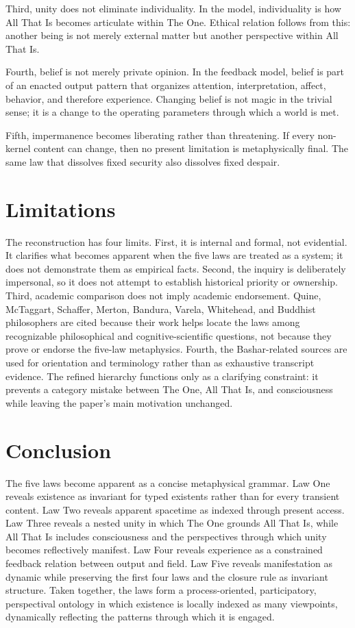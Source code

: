 \documentclass[11pt]{article}
\begin{document}
Third, unity does not eliminate individuality.  In the model, individuality is how All That Is becomes articulate within The One.  Ethical relation follows from this: another being is not merely external matter but another perspective within All That Is.

Fourth, belief is not merely private opinion.  In the feedback model, belief is part of an enacted output pattern that organizes attention, interpretation, affect, behavior, and therefore experience.  Changing belief is not magic in the trivial sense; it is a change to the operating parameters through which a world is met.

Fifth, impermanence becomes liberating rather than threatening.  If every non-kernel content can change, then no present limitation is metaphysically final.  The same law that dissolves fixed security also dissolves fixed despair.

\section{Limitations}

The reconstruction has four limits.  First, it is internal and formal, not evidential.  It clarifies what becomes apparent when the five laws are treated as a system; it does not demonstrate them as empirical facts.  Second, the inquiry is deliberately impersonal, so it does not attempt to establish historical priority or ownership.  Third, academic comparison does not imply academic endorsement.  Quine, McTaggart, Schaffer, Merton, Bandura, Varela, Whitehead, and Buddhist philosophers are cited because their work helps locate the laws among recognizable philosophical and cognitive-scientific questions, not because they prove or endorse the five-law metaphysics.  Fourth, the Bashar-related sources are used for orientation and terminology rather than as exhaustive transcript evidence.  The refined hierarchy functions only as a clarifying constraint: it prevents a category mistake between The One, All That Is, and consciousness while leaving the paper's main motivation unchanged.

\section{Conclusion}

The five laws become apparent as a concise metaphysical grammar.  Law One reveals existence as invariant for typed existents rather than for every transient content.  Law Two reveals apparent spacetime as indexed through present access.  Law Three reveals a nested unity in which The One grounds All That Is, while All That Is includes consciousness and the perspectives through which unity becomes reflectively manifest.  Law Four reveals experience as a constrained feedback relation between output and field.  Law Five reveals manifestation as dynamic while preserving the first four laws and the closure rule as invariant structure.  Taken together, the laws form a process-oriented, participatory, perspectival ontology in which existence is locally indexed as many viewpoints, dynamically reflecting the patterns through which it is engaged.
\end{document}
